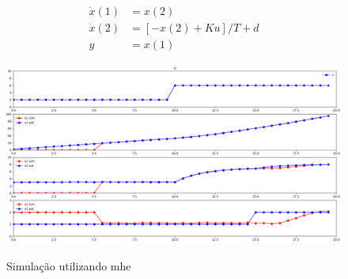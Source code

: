 \begin{subequations}
	\label{eq:motor_dynamics_ss}
	\begin{align}
		\dot{x}(1) &= x(2) 					\\
		\dot{x}(2) &= [-x(2) + Ku] / T + d	\\
		y &= x(1)
	\end{align}
\end{subequations}

	
\begin{figure}[h]
	\caption{Simulação utilizando \acrlong{mhe}}
	\begin{center}
		\includegraphics[width=1\textwidth]{./5_images/fig_mhe_example.png} 
		\label{fig:mhe_example}
	\end{center}
	\centering
\end{figure}
